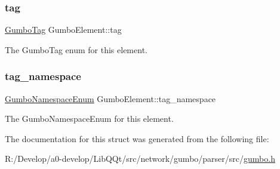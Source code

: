 \subsubsection{\texorpdfstring{tag}{tag}}
{\footnotesize\ttfamily \mbox{\hyperlink{gumbo_8h_a5a3aa6f4b039f85875d638088e676a0f}{Gumbo\+Tag}} Gumbo\+Element\+::tag}

The Gumbo\+Tag enum for this element. \mbox{\label{struct_gumbo_element_a6c01efba44e5efdef53a68d628d6e6fc}} 
\subsubsection{\texorpdfstring{tag\+\_\+namespace}{tag\_namespace}}
{\footnotesize\ttfamily \mbox{\hyperlink{gumbo_8h_a5792dfd02513e421fb8f083f08e58cc6}{Gumbo\+Namespace\+Enum}} Gumbo\+Element\+::tag\+\_\+namespace}

The Gumbo\+Namespace\+Enum for this element. 

The documentation for this struct was generated from the following file\+:\begin{DoxyCompactItemize}
\item 
R\+:/\+Develop/a0-\/develop/\+Lib\+Q\+Qt/src/network/gumbo/parser/src/\mbox{\hyperlink{gumbo_8h}{gumbo.\+h}}\end{DoxyCompactItemize}
